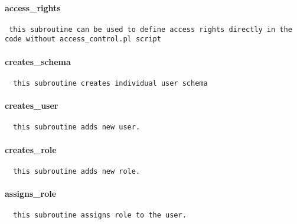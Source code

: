 \paragraph*{access\_rights\label{Apiis::Auth::AccessControl_--_used_by_the_runall_pl_and_access_control_pl_scripts_to_define_user_access_rights_access_rights}}
\begin{verbatim}
 this subroutine can be used to define access rights directly in the code without access_control.pl script
\end{verbatim}
\paragraph*{creates\_schema\label{Apiis::Auth::AccessControl_--_used_by_the_runall_pl_and_access_control_pl_scripts_to_define_user_access_rights_creates_schema}}
\begin{verbatim}
  this subroutine creates individual user schema
\end{verbatim}
\paragraph*{creates\_user\label{Apiis::Auth::AccessControl_--_used_by_the_runall_pl_and_access_control_pl_scripts_to_define_user_access_rights_creates_user}}
\begin{verbatim}
  this subroutine adds new user.
\end{verbatim}
\paragraph*{creates\_role\label{Apiis::Auth::AccessControl_--_used_by_the_runall_pl_and_access_control_pl_scripts_to_define_user_access_rights_creates_role}}
\begin{verbatim}
  this subroutine adds new role.
\end{verbatim}
\paragraph*{assigns\_role\label{Apiis::Auth::AccessControl_--_used_by_the_runall_pl_and_access_control_pl_scripts_to_define_user_access_rights_assigns_role}}
\begin{verbatim}
  this subroutine assigns role to the user.
\end{verbatim}
